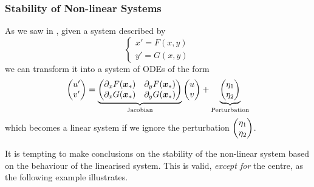 \subsubsection{Stability of Non-linear Systems}

As we saw in , given a system described by
\[
\begin{cases}
	x' = F(x,y) \\
	y' = G(x,y)
\end{cases}
\]
we can transform it into a system of ODEs of the form
\[
\begin{pmatrix}u'\\v'\end{pmatrix} = \underbrace{\begin{pmatrix}\partial_x F(\bm{x}_{\ast}) & \partial_y F(\bm{x}_{\ast}) \\ \partial_x G(\bm{x}_{\ast}) & \partial_y G(\bm{x}_{\ast})\end{pmatrix}}_{\text{Jacobian}} \begin{pmatrix}u\\v\end{pmatrix} + \underbrace{\begin{pmatrix}\eta_1 \\ \eta_2\end{pmatrix}}_{\text{Perturbation}}
\]
which becomes a linear system if we ignore the perturbation $\begin{pmatrix}\eta_1 \\ \eta_2\end{pmatrix}$.

It is tempting to make conclusions on the stability of the non-linear system based on the behaviour of the linearised system. This is valid, \emph{except for} the centre, as the following example illustrates.


